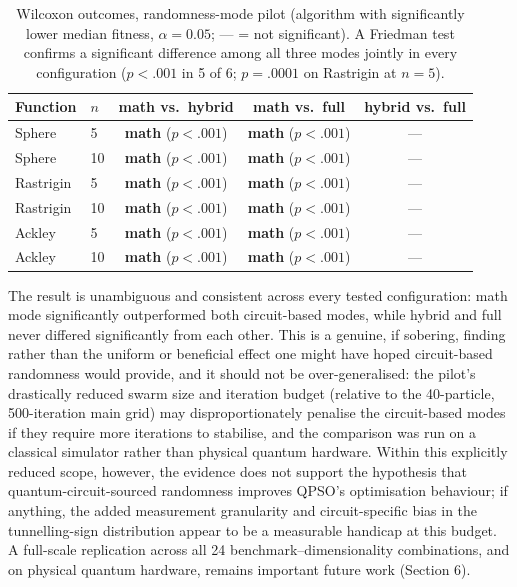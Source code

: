 \documentclass[11pt]{article}
\begin{document}
\begin{table}[h]
\centering
\scriptsize
\begin{tabular}{llccc}
\toprule
Function & $n$ & math vs.\ hybrid & math vs.\ full & hybrid vs.\ full \\
\midrule
Sphere & 5 & \textbf{math} ($p<.001$) & \textbf{math} ($p<.001$) & --- \\
Sphere & 10 & \textbf{math} ($p<.001$) & \textbf{math} ($p<.001$) & --- \\
Rastrigin & 5 & \textbf{math} ($p<.001$) & \textbf{math} ($p<.001$) & --- \\
Rastrigin & 10 & \textbf{math} ($p<.001$) & \textbf{math} ($p<.001$) & --- \\
Ackley & 5 & \textbf{math} ($p<.001$) & \textbf{math} ($p<.001$) & --- \\
Ackley & 10 & \textbf{math} ($p<.001$) & \textbf{math} ($p<.001$) & --- \\
\bottomrule
\end{tabular}
\caption{Wilcoxon outcomes, randomness-mode pilot (algorithm with significantly lower median fitness, $\alpha=0.05$; --- = not significant). A Friedman test confirms a significant difference among all three modes jointly in every configuration ($p<.001$ in 5 of 6; $p=.0001$ on Rastrigin at $n=5$).}
\label{tab:randomness_sig}
\end{table}

The result is unambiguous and consistent across every tested configuration: math mode significantly outperformed both circuit-based modes, while hybrid and full never differed significantly from each other. This is a genuine, if sobering, finding rather than the uniform or beneficial effect one might have hoped circuit-based randomness would provide, and it should not be over-generalised: the pilot's drastically reduced swarm size and iteration budget (relative to the 40-particle, 500-iteration main grid) may disproportionately penalise the circuit-based modes if they require more iterations to stabilise, and the comparison was run on a classical simulator rather than physical quantum hardware. Within this explicitly reduced scope, however, the evidence does not support the hypothesis that quantum-circuit-sourced randomness improves QPSO's optimisation behaviour; if anything, the added measurement granularity and circuit-specific bias in the tunnelling-sign distribution appear to be a measurable handicap at this budget. A full-scale replication across all 24 benchmark--dimensionality combinations, and on physical quantum hardware, remains important future work (Section 6).
\end{document}
